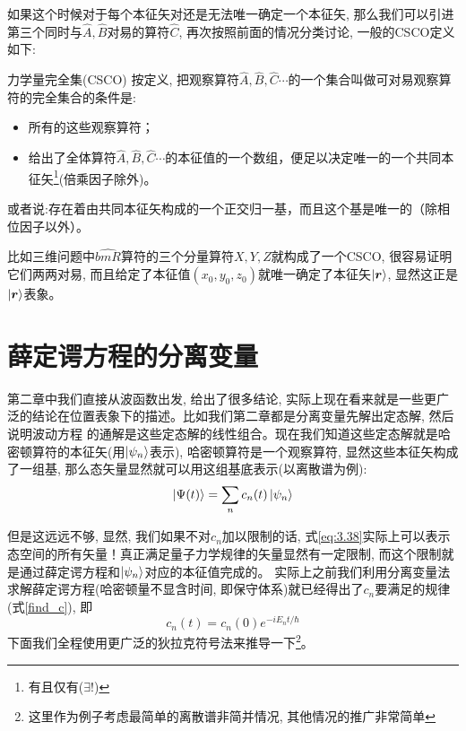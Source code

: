 \documentclass[a4paper,zihao=-4,linespread=1]{ctexrep}
\begin{document}
    如果这个时候对于每个本征矢对还是无法唯一确定一个本征矢, 那么我们可以引进第三个同时与$\hat A,\hat B$对易的算符$\hat C$, 再次按照前面的情况分类讨论, 一般的CSCO定义如下:
    \begin{define}{力学量完全集(CSCO)}
        \setlength\parindent{2em}按定义, 把观察算符$\hat A,\hat B,\hat C\cdots$的一个集合叫做可对易观察算符的完全集合的条件是:
        \begin{itemize}
            \item 所有的这些观察算符；
            \item 给出了全体算符$\hat A,\hat B,\hat C\cdots$的本征值的一个数组，便足以决定唯一的一个共同本征矢\footnote{有且仅有($\exists!$)}(倍乘因子除外)。
        \end{itemize}
        \setlength\parindent{2em}或者说:存在着由共同本征矢构成的一个正交归一基，而且这个基是唯一的（除相位因子以外）。
    \end{define}
    比如三维问题中$\hat{bm{R}}$算符的三个分量算符$X,Y,Z$就构成了一个CSCO, 很容易证明它们两两对易, 而且给定了本征值$(x_0,y_0,z_0)$就唯一确定了本征矢$\ket{\bm{r}}$, 显然这正是$\ket{\bm{r}}$表象。

    \section{薛定谔方程的分离变量}
    第二章中我们直接从波函数出发, 给出了很多结论, 实际上现在看来就是一些更广泛的结论在位置表象下的描述。比如我们第二章都是分离变量先解出定态解, 然后说明波动方程
    的通解是这些定态解的线性组合。现在我们知道这些定态解就是哈密顿算符的本征矢(用$\ket{\psi_n}$表示), 哈密顿算符是一个观察算符, 显然这些本征矢构成了一组基, 那么态矢量显然就可以用这组基底表示(以离散谱为例):
    \begin{equation}
        \label{eq:3.38}
        \Ket{\Psi(t)}=\sum_n c_n(t)\ket{\psi_n}
    \end{equation}
    
    但是这远远不够, 显然, 我们如果不对$c_n$加以限制的话, 式\ref{eq:3.38}实际上可以表示态空间的所有矢量！真正满足量子力学规律的矢量显然有一定限制, 而这个限制就是通过薛定谔方程和$\ket{\psi_n}$对应的本征值完成的。
    实际上之前我们利用分离变量法求解薛定谔方程(哈密顿量不显含时间, 即保守体系)就已经得出了$c_n$要满足的规律(式\ref{find_c}), 即\[c_n(t)=c_n(0) e^{-iE_n t/\hbar}\]
    下面我们全程使用更广泛的狄拉克符号法来推导一下\footnote{这里作为例子考虑最简单的离散谱非简并情况, 其他情况的推广非常简单}。
    
\end{document}

